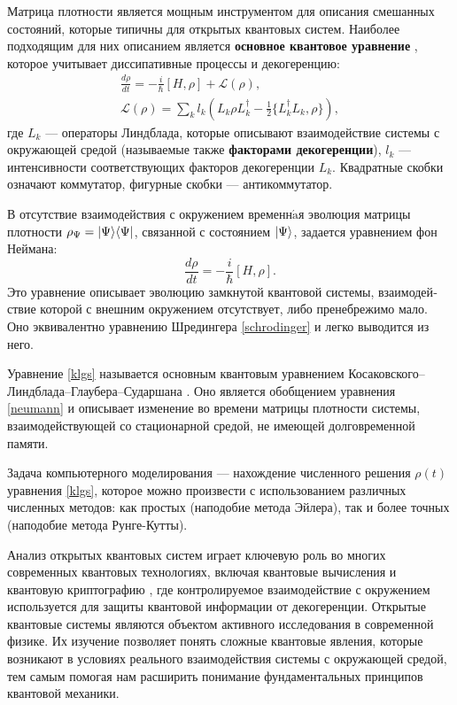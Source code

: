 Матрица плотности является мощным инструментом для описания смешанных состояний, которые типичны для открытых квантовых систем. Наиболее подходящим для них описанием является \textbf{основное квантовое уравнение} \cite{breuer}, которое учитывает диссипативные процессы и декогеренцию:
\begin{equation}\label{klgs}
\begin{gathered}
	\frac{d\rho}{dt} = -\frac{i}{\hbar}[H, \rho] + \mathcal{L}(\rho),\\[12pt]
	{\mathcal L}(\rho)=\sum_{k} l_{k}\left(L_{k} \rho L_{k}^{\dagger} - \frac{1}{2} \{L_{k}^{\dagger}L_{k}, \rho \} \right),
\end{gathered}
\end{equation}
где $L_{k}$ --- операторы Линдблада, которые описывают взаимодействие системы с окружающей средой (называемые также \textbf{факторами декогеренции}), $l_{k}$ --- интенсивности соответствующих факторов декогеренции $L_{k}$. Квадратные скобки означают коммутатор, фигурные скобки --- антикоммутатор.

В отсутствие взаимодействия с окружением временн$\acute{\text{a}}$я эволюция матрицы плотности $\rho_{\Psi} = |\Psi\rangle\langle\Psi|$, связанной с состоянием $|\Psi\rangle$, задается уравнением фон Неймана:
\begin{equation}\label{neumann}
	\frac{d\rho}{dt} = -\frac{i}{\hbar}[H, \rho].
\end{equation}
\noindent Это уравнение описывает эволюцию замкнутой квантовой системы, взаимодей­ствие которой с внешним окружением отсутствует, либо пренебрежимо мало. Оно эквивалентно уравнению Шредингера \eqref{schrodinger} и легко выводится из него.

Уравнение \eqref{klgs} называется основным квантовым уравнением Ко­саковского–Линдблада–Глаубера–Сударшана \cite{breuer,kossakowski,lindblad}. Оно является обобще­нием уравнения \eqref{neumann} и описывает изменение во времени матрицы плотности системы, взаимодействующей со стационарной средой, не имеющей долговре­менной памяти.

Задача компьютерного моделирования — нахождение численного решения $\rho(t)$ уравнения \eqref{klgs}, которое можно произвести с использованием различных численных методов: как простых (наподобие метода Эйлера), так и более точ­ных (наподобие метода Рунге-Кутты).

Анализ открытых квантовых систем играет ключевую роль во многих современных квантовых технологиях, включая квантовые вычисления и квантовую криптографию \cite{akm2017}, где контролируемое взаимодействие с окру­жением используется для защиты квантовой информации от декогеренции. Открытые квантовые системы являются объектом активного исследования в со­временной физике. Их изучение позволяет понять сложные квантовые явления, которые возникают в условиях реального взаимодействия системы с окружаю­щей средой, тем самым помогая нам расширить понимание фундаментальных принципов квантовой механики.

